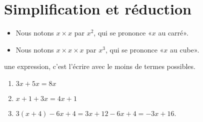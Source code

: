 \section{Simplification et réduction}

\begin{definition}
    \begin{itemize}
        \item 
    Nous notons \( x\times x\) par \( x^2\), qui se prononce «\( x\) au carré».
\item
    Nous notons \( x\times x\times x\) par \( x^3\), qui se prononce «\( x\) au cube».
    \end{itemize}
\end{definition}

\begin{Aretenir}
     une expression, c'est l'écrire avec le moins de termes possibles.
\end{Aretenir}

\begin{example}
    \begin{enumerate}
        \item
            \( 3x+5x=8x\)
        \item
            \( x+1+3x=4x+1\)
        \item
            \( 3(x+4)-6x+4=3x+12-6x+4=-3x+16\).
    \end{enumerate}
\end{example}

